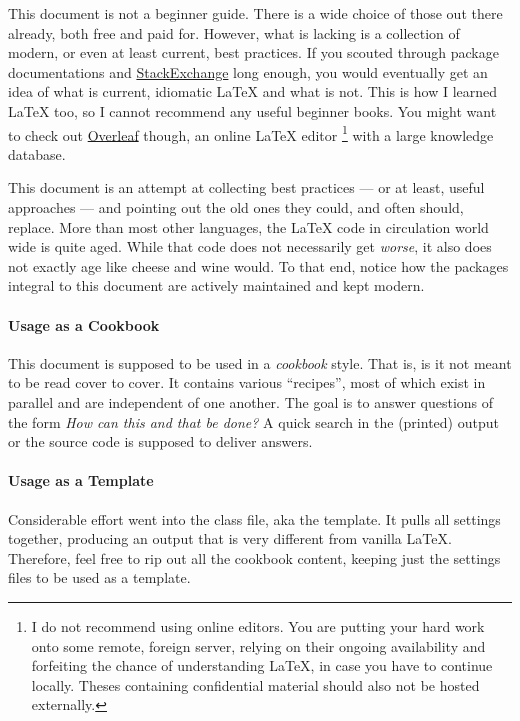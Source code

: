 
This document is not a beginner guide.
There is a wide choice of those out there already, both free and paid for.
However, what is lacking is a collection of modern, or even at least current,
best practices.
If you scouted through package documentations and
\href{https://tex.stackexchange.com/}{StackExchange}
long enough, you would eventually get an idea of what is current, idiomatic \LaTeX{}
and what is not.
This is how I learned \LaTeX{} too, so I cannot recommend any useful beginner books.
You might want to check out \href{https://www.overleaf.com/}{Overleaf} though,
an online \LaTeX{} editor%
\footnote{%
    I do not recommend using online editors.
    You are putting your hard work onto some remote, foreign server, relying on
    their ongoing availability and forfeiting the chance of understanding \LaTeX{},
    in case you have to continue locally.
    Theses containing confidential material should also not be hosted externally.
}
with a large knowledge database.

This document is an attempt at collecting best practices
--- or at least, useful approaches ---
and pointing out the old ones they could, and often should, replace.
More than most other languages, the \LaTeX{} code in circulation world wide is
quite aged.
While that code does not necessarily get \emph{worse}, it also does not exactly
age like cheese and wine would.
To that end, notice how the packages integral to this document are actively
maintained and kept modern.

\paragraph{Usage as a Cookbook}
This document is supposed to be used in a \emph{cookbook} style.
That is, is it not meant to be read cover to cover.
It contains various \enquote{recipes}, most of which exist in parallel and
are independent of one another.
The goal is to answer questions of the form \emph{How can this and that be done?}
A quick search in the (printed) output or the source code is supposed to deliver
answers.

\paragraph{Usage as a Template}
Considerable effort went into the class file, aka the template.
It pulls all settings together, producing an output that is very different from
vanilla \LaTeX{}.
Therefore, feel free to rip out all the cookbook content, keeping just the settings
files to be used as a template.

